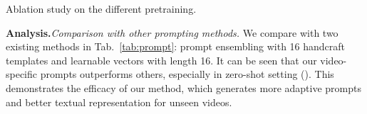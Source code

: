 \documentclass[runningheads]{llncs}
\begin{document}
\begin{table}[tb]

\begin{minipage}{0.37\columnwidth}  
\caption{Ablation study on the different pretraining.}
\centering
{}
\label{tab:pretrain} 
\end{minipage}\noindent\hfill
\begin{minipage}{0.58\columnwidth}

\caption{Comparison of two sampling methods. }
\label{tab:sampling}
\end{minipage}
\vspace{-0.5cm}
\end{table} 
 \noindent\textbf{Analysis.}\textit{Comparison with other prompting methods.} We compare with two existing methods in Tab.~\ref{tab:prompt}: prompt ensembling \cite{clip} with 16 handcraft templates and learnable vectors \cite{zhou2021coop} with length 16. It can be seen that our video-specific prompts outperforms others, especially in zero-shot setting (). This demonstrates the efficacy of our method, which generates more adaptive prompts and better textual representation for unseen videos. 
\end{document}
